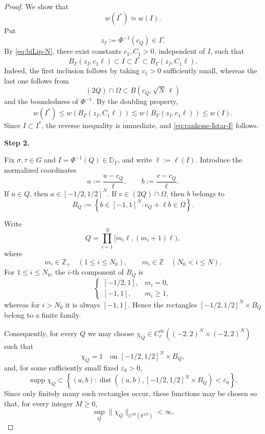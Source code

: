\documentclass[12pt]{amsart}
\begin{document}
\begin{proof}
We show that
\begin{equation}\label{eq:rankone-Istar-I}
w(I^\ast)\simeq w(I).
\end{equation}
Put
\[
z_I:=\Phi^{-1}(c_Q)\in\Gamma.
\]
By \eqref{eq:biLip-N}, there exist constants $c_1,C_1>0$,
independent of $I$, such that
\[
B_\Gamma(z_I,c_1\ell)
\subset I
\subset I^\ast
\subset B_\Gamma(z_I,C_1\ell).
\]
Indeed, the first inclusion follows by taking $c_1>0$ sufficiently
small, whereas the last one follows from
\[
(2Q)\cap\Omega
\subset B(c_Q,\sqrt N\,\ell)
\]
and the boundedness of $\Phi^{-1}$. By the doubling property,
\[
w(I^\ast)
\leq
w(B_\Gamma(z_I,C_1\ell))
\lesssim
w(B_\Gamma(z_I,c_1\ell))
\leq
w(I).
\]
Since $I\subset I^\ast$, the reverse inequality is immediate, and
\eqref{eq:rankone-Istar-I} follows.

\medskip
\noindent
\textbf{Step 2.}

Fix $\sigma,\tau\in G$ and
$I=\Phi^{-1}(Q)\in\mathbb D_\Gamma$, and write
$
\ell:=\ell(I).
$
Introduce the normalized coordinates
\[
a:=\frac{u-c_Q}{\ell},
\qquad
b:=\frac{v-c_Q}{\ell}.
\]
If $u\in Q$, then
$
a\in [-1/2,1/2]^N.
$
If $v\in(2Q)\cap\Omega$, then $b$ belongs to
\[
B_Q
:=
\left\{
b\in[-1,1]^N:
c_Q+\ell b\in\Omega
\right\}.
\]

Write
\[
Q=\prod_{i=1}^N
[m_i\ell,(m_i+1)\ell),
\]
where
\[
m_i\in\mathbb Z_+
\quad (1\leq i\leq N_0),
\qquad
m_i\in\mathbb Z
\quad (N_0<i\leq N).
\]
For $1\leq i\leq N_0$, the $i$-th component of $B_Q$ is
\[
\begin{cases}
[-1/2,1],&m_i=0,\\
[-1,1],&m_i\geq1,
\end{cases}
\]
whereas for $i>N_0$ it is always $[-1,1]$. Hence the rectangles
$
[-1/2,1/2]^N\times B_Q
$
belong to a finite family.

Consequently, for every $Q$ we may choose
$
\chi_Q\in
C_c^\infty((-2,2)^N\times(-2,2)^N)
$
such that
\[
\chi_Q=1
\quad\text{on }
[-1/2,1/2]^N\times B_Q,
\]
and, for some sufficiently small fixed $\varepsilon_0>0$,
\[
\operatorname{supp}\chi_Q
\subset
\left\{
(a,b):
\operatorname{dist}
\left(
(a,b),
[-1/2,1/2]^N\times B_Q
\right)
<\varepsilon_0
\right\}.
\]
Since only finitely many such rectangles occur, these functions may
be chosen so that, for every integer $M\geq0$,
\begin{equation}\label{eq:rankone-chi-uniform}
\sup_Q
\|\chi_Q\|_{C^M(\mathbb R^{2N})}
<\infty.
\end{equation}


\end{proof}
\end{document}
